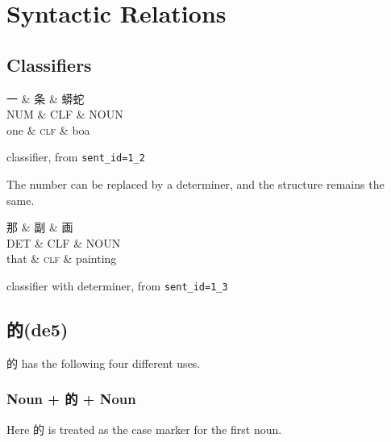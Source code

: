 \documentclass[UTF8,oneside]{book}
\begin{document}
\chapter{Syntactic Relations}

\section{Classifiers}

\begin{tree}[h]
\centering
\begin{dependency}[theme=simple]
\begin{deptext}[column sep=.5cm, row sep=.5ex]
一  \& 条  \& 蟒蛇 \\
NUM \& CLF \& NOUN \\
one \& \textsc{clf} \& boa \\
\end{deptext}
\end{dependency}
\caption{classifier, from \texttt{sent\_id=1\_2}}
\end{tree}

The number can be replaced by a determiner, and the structure remains the same. 

\begin{tree}[h]
\centering
\begin{dependency}[theme=simple]
\begin{deptext}[column sep=.5cm, row sep=.5ex]
那  \& 副  \& 画 \\
DET \& CLF \& NOUN \\
that \& \textsc{clf} \& painting \\
\end{deptext}
\end{dependency}
\caption{classifier with determiner, from \texttt{sent\_id=1\_3}}
\end{tree}

\newpage
\section{的(de5)} 
的 has the following four different uses.

\subsection{Noun + 的 + Noun}
Here 的 is treated as the case marker for the first noun. 
\end{document}
